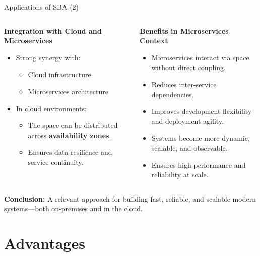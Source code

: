 \documentclass[aspectratio=169, table]{beamer}
\begin{document}
	\begin{frame}{Applications of SBA (2)}
		\vspace{20pt}
		\begin{columns}[t]
			\begin{column}{0.5\textwidth}
				\textbf{Integration with Cloud and Microservices}
				\begin{itemize}
					\item Strong synergy with:
					\begin{itemize}
						\item Cloud infrastructure
						\item Microservices architecture
					\end{itemize}
					\item In cloud environments:
					\begin{itemize}
						\item The space can be distributed across \textbf{availability zones}.
						\item Ensures data resilience and service continuity.
					\end{itemize}
				\end{itemize}
			\end{column}
			
			\begin{column}{0.5\textwidth}
				\textbf{Benefits in Microservices Context}
				\begin{itemize}
					\item Microservices interact via space without direct coupling.
					\item Reduces inter-service dependencies.
					\item Improves development flexibility and deployment agility.
					\item Systems become more dynamic, scalable, and observable.
					\item Ensures high performance and reliability at scale.
				\end{itemize}
			\end{column}
		\end{columns}
		\vspace{10pt}
		\textbf{Conclusion:} A relevant approach for building fast, reliable, and scalable modern systems—both on-premises and in the cloud.
	\end{frame}
	
	\section{Advantages}
	
\end{document}
